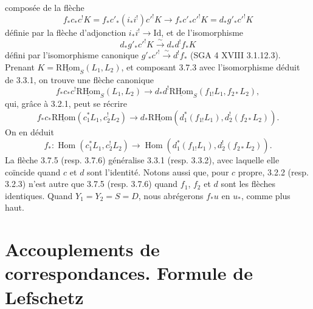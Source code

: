 \documentclass[11pt]{article}
\DeclareMathOperator{\Hom}{Hom}
\providecommand{\RHom}{\mathrm{RHom}}
\providecommand{\uRHom}{\underline{\RHom}}
\providecommand{\Id}{\mathrm{Id}}
\providecommand{\RHom}{\mathrm{RHom}}
\providecommand{\Hom}{\operatorname{Hom}}
\providecommand{\RHom}{\mathrm R\mathcal{H}om}
\providecommand{\RHom}{\mathrm{RHom}}
\providecommand{\Hom}{\operatorname{Hom}}
\begin{document}
composée de la flèche
\[
f_*c_*c^!K=f_*c'_*(i_*i^!)c'^!K\longrightarrow f_*c'_*c'^!K=d_*g'_*c'^!K
\]
définie par la flèche d'adjonction $i_*i^!\to\Id$, et de l'isomorphisme
\[
d_*g'_*c'^!K\xrightarrow{\sim}d_*d^!f_*K
\]
défini par l'isomorphisme canonique $g'_*c'^!\xrightarrow{\sim}d^!f_*$ (SGA 4 XVIII 3.1.12.3). Prenant $K=\uRHom_S(L_1,L_2)$, et composant 3.7.3 avec l'isomorphisme déduit de 3.3.1, on trouve une flèche canonique
\begin{equation}
f_*c_*c^!\uRHom_S(L_1,L_2)
\longrightarrow
 d_*d^!\uRHom_S(f_{1!}L_1,f_{2*}L_2),
\tag{3.7.4}
\end{equation}
qui, grâce à 3.2.1, peut se récrire
\begin{equation}
f_*c_*\uRHom(c_1^*L_1,c_2^!L_2)
\longrightarrow
 d_*\uRHom(d_1^*(f_{1!}L_1),d_2^!(f_{2*}L_2)).
\tag{3.7.5}
\end{equation}
On en déduit
\begin{equation}
f_*:\Hom(c_1^*L_1,c_2^!L_2)
\longrightarrow
\Hom(d_1^*(f_{1!}L_1),d_2^!(f_{2*}L_2)).
\tag{3.7.6}
\end{equation}
La flèche 3.7.5 (resp. 3.7.6) généralise 3.3.1 (resp. 3.3.2), avec laquelle elle coïncide quand $c$ et $d$ sont l'identité. Notons aussi que, pour $c$ propre, 3.2.2 (resp. 3.2.3) n'est autre que 3.7.5 (resp. 3.7.6) quand $f_1$, $f_2$ et $d$ sont les flèches identiques. Quand $Y_1=Y_2=S=D$, nous abrégerons $f_*u$ en $u_*$, comme plus haut.

\section{Accouplements de correspondances. Formule de Lefschetz}
\end{document}
